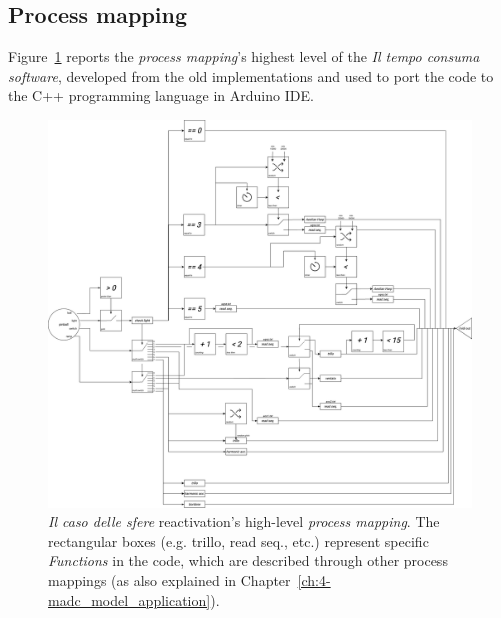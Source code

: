 \subsection*{Process mapping}
Figure~\ref{fig:ab-mapping-process} reports the \textit{process mapping}'s highest level of the \textit{Il tempo consuma software}, developed from the old implementations and used to port the code to the C++ programming language in Arduino IDE.
\begin{figure}[!h]
    \centering
    \includegraphics[width=\linewidth]{chapters/appendix/b/image/graphb-mapping-process.png}
    \caption{\textit{Il caso delle sfere} reactivation’s high-level \textit{process mapping}. The rectangular boxes (e.g. trillo, read seq., etc.) represent specific \textit{Functions} in the code, which are described through other process mappings (as also explained in Chapter~\ref{ch:4-madc_model_application}).}
    \label{fig:ab-mapping-process}
\end{figure}

